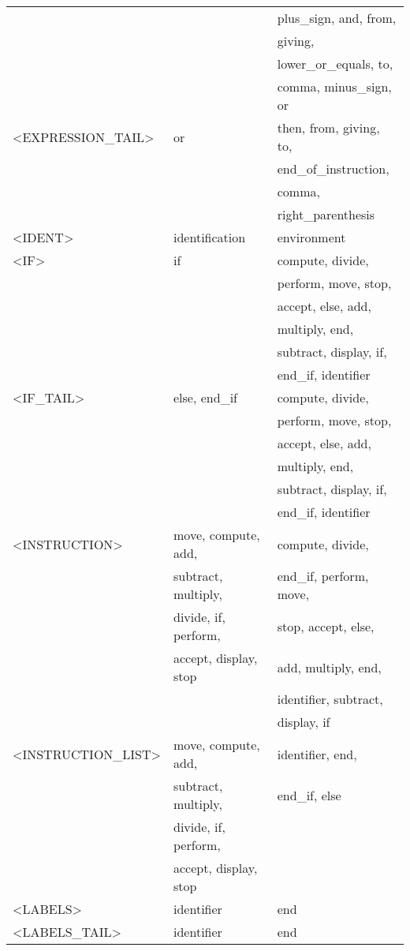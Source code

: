 \begin{longtable}{|l|l|l|}
  &  &   plus\_sign, and, from, \\ 
  &  &   giving, \\ 
  &  &   lower\_or\_equals, to, \\ 
  &  &   comma, minus\_sign, or\\ 
  \hline
<EXPRESSION\_TAIL>  &  or&   then, from, giving, to, \\ 
  &  &   end\_of\_instruction, \\ 
  &  &   comma, \\ 
  &  &   right\_parenthesis\\ 
  \hline
<IDENT>  &  identification&   environment\\ 
  \hline
<IF>  &  if&   compute, divide, \\ 
  &  &   perform, move, stop, \\ 
  &  &   accept, else, add, \\ 
  &  &   multiply, end, \\ 
  &  &   subtract, display, if, \\ 
  &  &   end\_if, identifier\\ 
  \hline
<IF\_TAIL>  &  else, end\_if&   compute, divide, \\ 
  &  &   perform, move, stop, \\ 
  &  &   accept, else, add, \\ 
  &  &   multiply, end, \\ 
  &  &   subtract, display, if, \\ 
  &  &   end\_if, identifier\\ 
  \hline
<INSTRUCTION>  &  move, compute, add, &   compute, divide, \\ 
  &  subtract, multiply, &   end\_if, perform, move, \\ 
  &  divide, if, perform, &   stop, accept, else, \\ 
  &  accept, display, stop&   add, multiply, end, \\ 
  &  &   identifier, subtract, \\ 
  &  &   display, if\\ 
  \hline
<INSTRUCTION\_LIST>  &  move, compute, add, &   identifier, end, \\ 
  &  subtract, multiply, &   end\_if, else\\ 
  &  divide, if, perform, &   \\ 
  &  accept, display, stop&   \\ 
  \hline
<LABELS>  &  identifier&   end\\ 
  \hline
<LABELS\_TAIL>  &  identifier&   end\\ 

\end{longtable}
